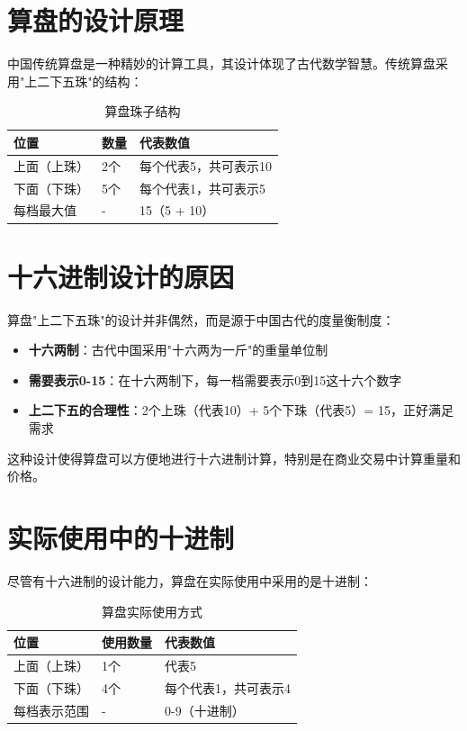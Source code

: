 \documentclass[12pt,UTF8]{ctexbook}
\begin{document}
\section{算盘的设计原理}

中国传统算盘是一种精妙的计算工具，其设计体现了古代数学智慧。传统算盘采用"上二下五珠"的结构：

\begin{table}[htbp]
    \centering
    \caption{算盘珠子结构}
    \begin{tabular}{|p{3cm}|p{3cm}|p{4cm}|}
        \hline
        \textbf{位置} & \textbf{数量} & \textbf{代表数值} \\
        \hline
        上面（上珠） & 2个 & 每个代表5，共可表示10 \\
        \hline
        下面（下珠） & 5个 & 每个代表1，共可表示5 \\
        \hline
        每档最大值 & - & 15（5 + 10） \\
        \hline
    \end{tabular}
\end{table}

\section{十六进制设计的原因}

算盘"上二下五珠"的设计并非偶然，而是源于中国古代的度量衡制度：

\begin{itemize}[leftmargin=2cm]
    \item \textbf{十六两制}：古代中国采用"十六两为一斤"的重量单位制
    \item \textbf{需要表示0-15}：在十六两制下，每一档需要表示0到15这十六个数字
    \item \textbf{上二下五的合理性}：2个上珠（代表10）+ 5个下珠（代表5）= 15，正好满足需求
\end{itemize}

这种设计使得算盘可以方便地进行十六进制计算，特别是在商业交易中计算重量和价格。

\section{实际使用中的十进制}

尽管有十六进制的设计能力，算盘在实际使用中采用的是十进制：

\begin{table}[htbp]
    \centering
    \caption{算盘实际使用方式}
    \begin{tabular}{|p{3cm}|p{3cm}|p{4cm}|}
        \hline
        \textbf{位置} & \textbf{使用数量} & \textbf{代表数值} \\
        \hline
        上面（上珠） & 1个 & 代表5 \\
        \hline
        下面（下珠） & 4个 & 每个代表1，共可表示4 \\
        \hline
        每档表示范围 & - & 0-9（十进制） \\
        \hline
    \end{tabular}
\end{table}
\end{document}
